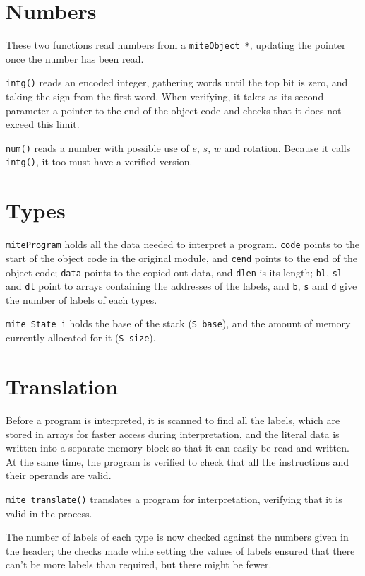 \documentclass[english]{scrartcl}
\begin{document}
\section{Numbers} \label{numbers}

These two functions read numbers from a \verb|miteObject *|, updating the
pointer once the number has been read.

\verb|intg()| reads an encoded integer, gathering words until the top bit is
zero, and taking the sign from the first word. When verifying, it takes as
its second parameter a pointer to the end of the object code and checks that
it does not exceed this limit.

\verb|num()| reads a number with possible use of $e$, $s$, $w$ and rotation.
Because it calls \verb|intg()|, it too must have a verified version.



\section{Types}

\verb|miteProgram| holds all the data needed to interpret a program. \verb|code|
points to the start of the object code in the original module, and \verb|cend|
points to the end of the object code; \verb|data| points to the copied out data,
and \verb|dlen| is its length; \verb|bl|, \verb|sl| and \verb|dl| point to arrays containing the
addresses of the labels, and \verb|b|, \verb|s| and \verb|d| give the number of labels of
each types.

\verb|mite_State_i| holds the base of the stack (\verb|S_base|), and the amount of
memory currently allocated for it (\verb|S_size|).



\section{Translation}

Before a program is interpreted, it is scanned to find all the labels, which
are stored in arrays for faster access during interpretation, and the
literal data is written into a separate memory block so that it can easily
be read and written. At the same time, the program is verified to check that
all the instructions and their operands are valid.

\verb|mite_translate()| translates a program for interpretation, verifying that
it is valid in the process.

The number of labels of each type is now checked against the numbers
given in the header; the checks made while setting the values of
labels ensured that there can't be more labels than required, but
there might be fewer.
\end{document}
